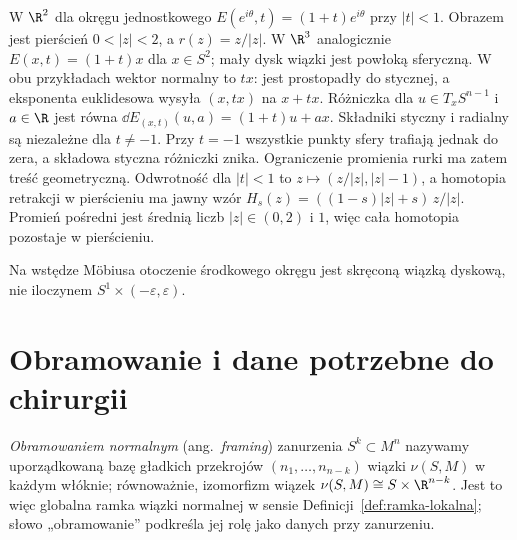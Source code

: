 \begin{przyklad}
\label{prz:tuba-okrag-sfera-20}
W $\R^2$ dla okręgu jednostkowego
$E(e^{i\theta},t)=(1+t)e^{i\theta}$
przy $|t|<1$. Obrazem jest pierścień
$0<|z|<2$, a $r(z)=z/|z|$.
W $\R^3$ analogicznie
$E(x,t)=(1+t)x$ dla $x\in S^2$;
mały dysk wiązki jest powłoką
sferyczną.
W obu przykładach wektor normalny to $tx$:
jest prostopadły do stycznej, a eksponenta euklidesowa
wysyła $(x,tx)$ na $x+tx$.
Różniczka dla $u\in T_xS^{n-1}$ i $a\in\R$ jest równa
$\dd E_{(x,t)}(u,a)=(1+t)u+ax$.
Składniki styczny i radialny są niezależne dla $t\ne-1$.
Przy $t=-1$ wszystkie punkty sfery trafiają jednak do zera,
a składowa styczna różniczki znika.
Ograniczenie promienia rurki ma zatem treść geometryczną.
Odwrotność dla $|t|<1$ to
$z\mapsto(z/|z|,|z|-1)$,
a homotopia retrakcji w pierścieniu ma jawny wzór
$H_s(z)=((1-s)|z|+s)\,z/|z|$.
Promień pośredni jest średnią liczb $|z|\in(0,2)$ i $1$,
więc cała homotopia pozostaje w pierścieniu.

Na wstędze Möbiusa
otoczenie środkowego okręgu
jest skręconą wiązką dyskową,
nie iloczynem $S^1\times(-\varepsilon,\varepsilon)$.
\end{przyklad}

\section{Obramowanie i dane potrzebne do chirurgii}
\label{sec:obramowanie-normalne}

\begin{definicja}[Obramowanie]
\label{def:obramowanie-normalne}
\emph{Obramowaniem normalnym} (ang.\ \emph{framing})
zanurzenia $S^k\subset M^n$ nazywamy
uporządkowaną bazę gładkich przekrojów
$(n_1,\ldots,n_{n-k})$ wiązki $\nu(S,M)$
w każdym włóknie; równoważnie,
izomorfizm wiązek
$\nu(S,M)\cong S\times\R^{n-k}$.
Jest to więc globalna ramka wiązki normalnej
w sensie Definicji~\ref{def:ramka-lokalna};
słowo „obramowanie” podkreśla jej rolę jako danych przy zanurzeniu.
\end{definicja}

